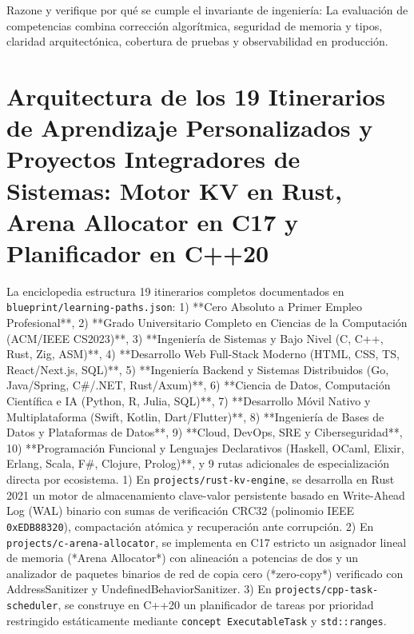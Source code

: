 \documentclass{book}
\begin{document}
\begin{tcolorbox}[title={Autoficha}, studiumcheck, breakable]

Razone y verifique por qué se cumple el invariante de ingeniería: La evaluación de competencias combina corrección algorítmica, seguridad de memoria y tipos, claridad arquitectónica, cobertura de pruebas y observabilidad en producción.
\end{tcolorbox}

\section{Arquitectura de los 19 Itinerarios de Aprendizaje Personalizados y Proyectos Integradores de Sistemas: Motor KV en Rust, Arena Allocator en C17 y Planificador en C++20}

La enciclopedia estructura 19 itinerarios completos documentados en \texttt{blueprint/learning-paths.json}: 1) **Cero Absoluto a Primer Empleo Profesional**, 2) **Grado Universitario Completo en Ciencias de la Computación (ACM/IEEE CS2023)**, 3) **Ingeniería de Sistemas y Bajo Nivel (C, C++, Rust, Zig, ASM)**, 4) **Desarrollo Web Full-Stack Moderno (HTML, CSS, TS, React/Next.js, SQL)**, 5) **Ingeniería Backend y Sistemas Distribuidos (Go, Java/Spring, C\#/.NET, Rust/Axum)**, 6) **Ciencia de Datos, Computación Científica e IA (Python, R, Julia, SQL)**, 7) **Desarrollo Móvil Nativo y Multiplataforma (Swift, Kotlin, Dart/Flutter)**, 8) **Ingeniería de Bases de Datos y Plataformas de Datos**, 9) **Cloud, DevOps, SRE y Ciberseguridad**, 10) **Programación Funcional y Lenguajes Declarativos (Haskell, OCaml, Elixir, Erlang, Scala, F\#, Clojure, Prolog)**, y 9 rutas adicionales de especialización directa por ecosistema.
1) En \texttt{projects/rust-kv-engine}, se desarrolla en Rust 2021 un motor de almacenamiento clave-valor persistente basado en Write-Ahead Log (WAL) binario con sumas de verificación CRC32 (polinomio IEEE \texttt{0xEDB88320}), compactación atómica y recuperación ante corrupción. 2) En \texttt{projects/c-arena-allocator}, se implementa en C17 estricto un asignador lineal de memoria (*Arena Allocator*) con alineación a potencias de dos y un analizador de paquetes binarios de red de copia cero (*zero-copy*) verificado con AddressSanitizer y UndefinedBehaviorSanitizer. 3) En \texttt{projects/cpp-task-scheduler}, se construye en C++20 un planificador de tareas por prioridad restringido estáticamente mediante \texttt{concept ExecutableTask} y \texttt{std::ranges}.
\end{document}
